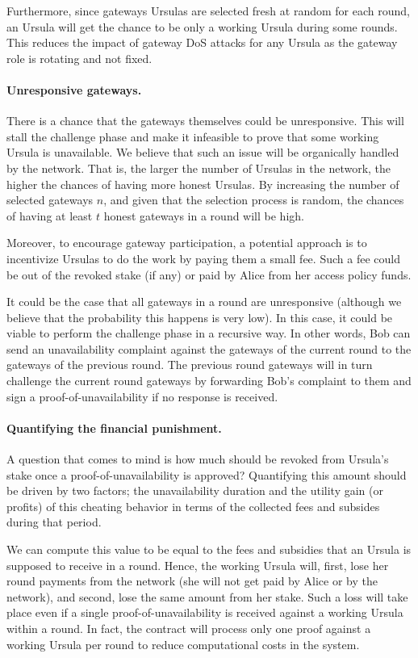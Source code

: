 Furthermore, since gateways Ursulas are selected fresh at random for each round, an Ursula will get the chance to be only a working Ursula during some rounds. This reduces the impact of gateway DoS attacks for any Ursula as the gateway role is rotating and not fixed.


\paragraph{\bf Unresponsive gateways.}
There is a chance that the gateways themselves could be unresponsive. This will stall the challenge phase and make it infeasible to prove that some working Ursula is unavailable. We believe that such an issue will be organically handled by the network. That is, the larger the number of Ursulas in the network, the higher the chances of having more honest Ursulas. By increasing the number of selected gateways $n$, and given that the selection process is random, the chances of having at least $t$ honest gateways in a round will be high.


Moreover, to encourage gateway participation, a potential approach is to incentivize Ursulas to do the work by paying them a small fee. Such a fee could be out of the revoked stake (if any) or paid by Alice from her access policy funds.


It could be the case that all gateways in a round are unresponsive (although we believe that the probability this happens is very low). In this case, it could be viable to perform the challenge phase in a recursive way. In other words, Bob can send an unavailability complaint against the gateways of the current round to the gateways of the previous round. The previous round gateways will in turn challenge the current round gateways by forwarding Bob's complaint to them and sign a proof-of-unavailability if no response is received. 


\paragraph{\bf Quantifying the financial punishment.}
A question that comes to mind is how much should be revoked from Ursula's stake once a proof-of-unavailability is approved? Quantifying this amount should be driven by two factors; the unavailability duration and the utility gain (or profits) of this cheating behavior in terms of the collected fees and subsides during that period.


We can compute this value to be equal to the fees and subsidies that an Ursula is supposed to receive in a round. Hence, the working Ursula will, first, lose her round payments from the network (she will not get paid by Alice or by the network), and second, lose the same amount from her stake. Such a loss will take place even if a single proof-of-unavailability is received against a working Ursula within a round. In fact, the \stakeescrow contract will process only one proof against a working Ursula per round to reduce computational costs in the system. 

